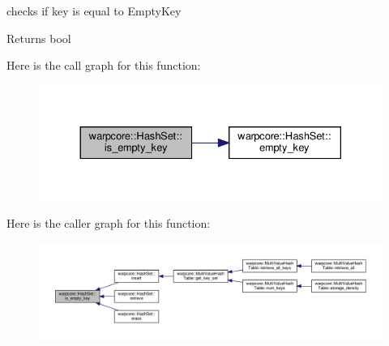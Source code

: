 checks if {\ttfamily key} is equal to {\ttfamily Empty\+Key} 

\begin{DoxyReturn}{Returns}
{\ttfamily bool} 
\end{DoxyReturn}
Here is the call graph for this function\+:
\nopagebreak
\begin{figure}[H]
\begin{center}
\leavevmode
\includegraphics[width=330pt]{classwarpcore_1_1HashSet_ade9bc606ceba67c90aac5ee3aa43ddc7_cgraph}
\end{center}
\end{figure}
Here is the caller graph for this function\+:
\nopagebreak
\begin{figure}[H]
\begin{center}
\leavevmode
\includegraphics[width=350pt]{classwarpcore_1_1HashSet_ade9bc606ceba67c90aac5ee3aa43ddc7_icgraph}
\end{center}
\end{figure}
\mbox{\label{classwarpcore_1_1HashSet_a74f48068d148b071761b1c214501770a}} 
